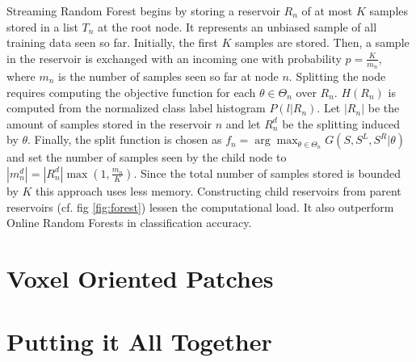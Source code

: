 \documentclass{llncs}
\begin{document}
  Streaming Random Forest begins by storing a reservoir $R_n$ of at most $K$ samples stored in a list $T_n$ at the root node. It represents an unbiased sample of all training data seen so far. Initially, the first $K$ samples are stored. Then, a sample in the reservoir is exchanged with an incoming one with probability $p = \frac{K}{m_n}$, where $m_n$ is the number of samples seen so far at node $n$. Splitting the node requires computing the objective function for each $\theta \in \Theta_n$ over $R_n$. $H(R_n)$ is computed from the normalized class label histogram $P(l|R_n)$. Let $|R_n|$ be the amount of samples stored in the reservoir $n$ and let $R_n^d$ be the splitting induced by $\theta$. Finally, the split function is chosen as $f_n = \arg \max_{\theta \in \Theta_n} G(S, S^L, S^R | \theta)$  and set the number of samples seen by the child node to $|m_n^d| = |R_n^d| \max {\left(1, \frac{m_n}{K}\right)}$. Since the total number of samples stored is bounded by $K$ this approach uses less memory. Constructing child reservoirs from parent reservoirs (cf. fig \ref{fig:forest}) lessen the computational load. It also outperform Online Random Forests in classification accuracy.

   
\section{Voxel Oriented Patches}


\section{Putting it All Together}



  
\end{document}
